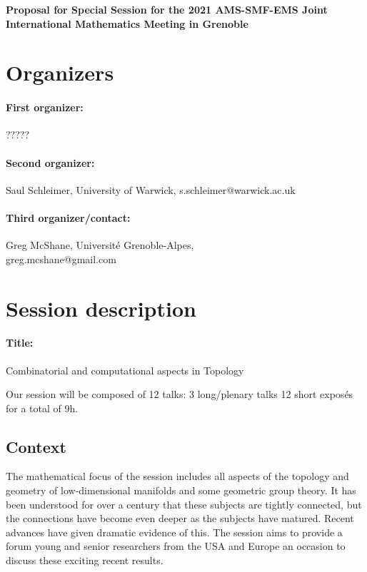 \documentclass[12pt,fleqn]{article}
\begin{document}
\begin{center}
{\huge \bf Proposal for Special Session
for the 2021 AMS-SMF-EMS Joint International Mathematics Meeting in Grenoble
}
\end{center}
\smallskip

\section{Organizers}

\paragraph{First organizer:} ?????

\paragraph{Second organizer:} Saul Schleimer, University of Warwick, s.schleimer@warwick.ac.uk

\paragraph{Third organizer/contact:} Greg McShane, Université Grenoble-Alpes,\\  \hspace*{5.6cm} greg.mcshane@gmail.com


\section{Session description}

\paragraph{Title:} {\large Combinatorial and computational aspects in Topology}

Our session will be composed of 12 talks: 
3 long/plenary talks 12 short exposés for a total of 9h.

\subsection{Context}

The mathematical focus of the session includes all aspects of the topology and geometry of low-dimensional manifolds and some geometric group theory. It has been understood for over a century that these subjects are tightly connected, but the connections have become even deeper as the subjects have matured. Recent advances have given dramatic evidence of this. The session aims to provide a forum  young and senior researchers from the USA and Europe an occasion to discuss these exciting recent results.
\end{document}
